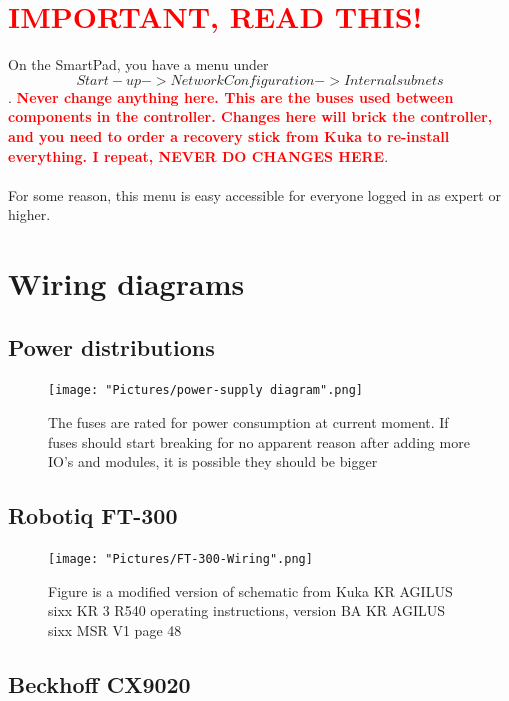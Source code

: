 \documentclass{article}
\begin{document}
\newpage

\section{\textbf{\textcolor{red}{IMPORTANT, READ THIS!}}}
On the SmartPad, you have a menu under $$Start-up->Network Configuration->Internal subnets$$. 
\textbf{\textcolor{red}{Never change anything here. This are the buses used between components in the controller. Changes here will brick the controller, and you need to order a recovery stick from Kuka to re-install everything. I repeat, NEVER DO CHANGES HERE}}. 
\\\\
For some reason, this menu is easy accessible for everyone logged in as expert or higher.

\newpage 

\section{Wiring diagrams}

    \subsection{Power distributions}
    
    \begin{figure}[!h]
        \centering
        \texttt{[image: "Pictures/power-supply diagram".png]}
        \caption{The fuses are rated for power consumption at current moment. If fuses should start breaking for no apparent reason after adding more IO's and modules, it is possible they should be bigger}
    \end{figure}
    
    \newpage
    
     \subsection{Robotiq FT-300}
    
    \begin{figure}[!h]
        \centering
        \texttt{[image: "Pictures/FT-300-Wiring".png]}
        \caption{Figure is a modified version of schematic from Kuka KR AGILUS sixx KR 3 R540 operating instructions, version BA KR AGILUS sixx MSR V1 page 48}
        \label{fig:my_label}
    \end{figure}
    
    \newpage
    
    \subsection{Beckhoff CX9020}
\end{document}
